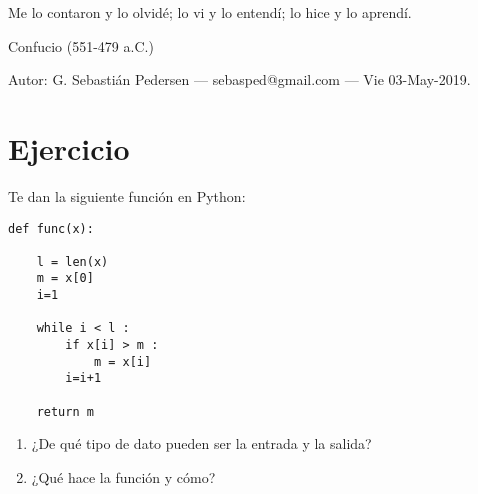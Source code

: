 \documentclass[a4paper,12pt]{article}
\begin{document}
\epigraph{Me lo contaron y lo olvidé; lo vi y lo entendí; lo hice y lo aprendí.}{Confucio (551-479 a.C.)}
\noindent Autor: G. Sebastián Pedersen --- sebasped@gmail.com --- Vie 03-May-2019.
\section*{Ejercicio} Te dan la siguiente función en Python:
\begin{verbatim}
def func(x):
    
    l = len(x)
    m = x[0]
    i=1
    
    while i < l :
        if x[i] > m :
            m = x[i]
        i=i+1
    
    return m

\end{verbatim}
\begin{enumerate}
	\item ¿De qué tipo de dato pueden ser la entrada y la salida?
	\item ¿Qué hace la función y cómo?
\end{enumerate}
\end{document}
